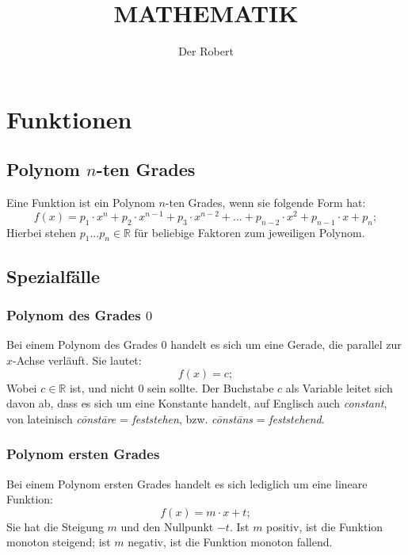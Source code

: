 \documentclass[a4paper]{article}
\begin{document}
\setlength{\parindent}{0mm}

\title{\textbf{MATHEMATIK}}
\author{Der Robert}
\maketitle

\tableofcontents

\newpage
\section{Funktionen}

\subsection{Polynom $n$-ten Grades}
Eine Funktion ist ein Polynom $n$-ten Grades,
wenn sie folgende Form hat:
\[
	f(x) = p_1 \cdot x^n + p_2 \cdot x^{n - 1} + p_3 \cdot x^{n - 2} + ... + p_{n - 2} \cdot x^2 + p_{n - 1} \cdot x + p_n ;
\]
Hierbei stehen
$p_1 ... p_n \in \mathbb{R} $
f\"ur beliebige Faktoren zum jeweiligen Polynom.

\subsection{Spezialf\"alle}

\subsubsection{Polynom des Grades $0$}
Bei einem Polynom des Grades $0$ handelt es sich um eine Gerade,
die parallel zur $x$-Achse verl\"auft.
Sie lautet:
\[
	f(x) = c ;
\]
Wobei $c \in \mathbb{R} $ ist,
und nicht $0$ sein sollte.
Der Buchstabe $c$ als Variable leitet sich davon ab,
dass es sich um eine Konstante handelt,
auf Englisch auch \textit{constant},
von lateinisch \textit{c\=onst\=are} = \textit{feststehen},
bzw. \textit{c\=onst\=ans} = \textit{feststehend}.

\subsubsection{Polynom ersten Grades}
Bei einem Polynom ersten Grades handelt es sich lediglich um eine lineare Funktion:
\[
f(x) = m \cdot x + t ;
\]
Sie hat die Steigung $m$ und den Nullpunkt $ -t $.
Ist $m$ positiv,
ist die Funktion monoton steigend;
ist $m$ negativ,
ist die Funktion monoton fallend.
\end{document}
